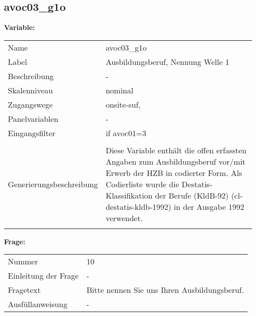 	
	
	\subsection{avoc03\_g1o}
	\label{subSection:avoc03_g1o}

	\noindent\textbf{Variable:}\\
		\begin{tabular}{lL{11.3cm}}
			\label{tableVariable:avoc03_g1o}
			Name & avoc03\_g1o \\
			Label & Ausbildungsberuf, Nennung Welle 1 \\
			Beschreibung & - \\
			Skalenniveau & nominal \\
			Zugangswege &
				onsite-suf,
 \\
			Panelvariablen & -
			 \\
			Eingangsfilter & if avoc01=3 \\
 \\
					Generierungsbeschreibung & Diese Variable enthält die offen erfassten Angaben zum Ausbildungsberuf vor/mit Erwerb der HZB in codierter Form. Als Codierliste wurde die Destatis-Klassifikation der Berufe (KldB-92) (cl-destatis-kldb-1992) in der Ausgabe 1992 verwendet. 
				 \\	
			 \\
		\end{tabular}

		\vspace*{1 cm}
		\noindent\textbf{Frage:}\\
		\begin{tabular}{lL{11.3cm}}
			\label{tableQuestion:avoc03_g1o}
			Nummer & 10 \\
			Einleitung der Frage & - \\
			Fragetext & Bitte nennen Sie uns Ihren Ausbildungsberuf. \\
			Ausfüllanweisung & - \\
		\end{tabular}





